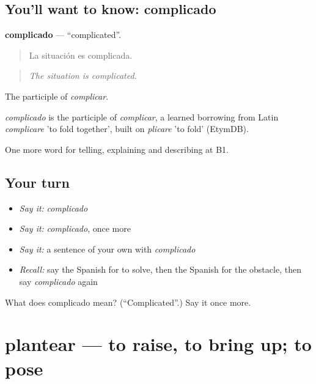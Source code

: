 \subsection*{You'll want to know: complicado}
\textbf{complicado} — \textquotedblleft{}complicated\textquotedblright{}.

\begin{quote}
La situación es complicada.
\end{quote}

\begin{quote}
\emph{The situation is complicated.}
\end{quote}

The participle of \emph{complicar}.

\begin{cousinweb}
\emph{complicado} is the participle of \emph{complicar}, a learned borrowing from Latin \emph{complicare} 'to fold together', built on \emph{plicare} 'to fold' (EtymDB).
\end{cousinweb}

\begin{grammarlens}[title={What you've built}]
One more word for telling, explaining and describing at B1.
\end{grammarlens}

\subsection*{Your turn}
\begin{itemize}
\raggedright
  \item \emph{Say it:} \emph{complicado}
  \item \emph{Say it:} \emph{complicado}, once more
  \item \emph{Say it:} a sentence of your own with \emph{complicado}
  \item \emph{Recall:} say the Spanish for to solve, then the Spanish for the obstacle, then say \emph{complicado} again
\end{itemize}

\begin{tcolorbox}[breakable,colback=teal!4,colframe=teal!35!black,title={Before you move on}]
What does complicado mean? (\textquotedblleft{}Complicated\textquotedblright{}.) Say it once more.
\end{tcolorbox}
\section[plantear]{plantear — to raise, to bring up; to pose}

